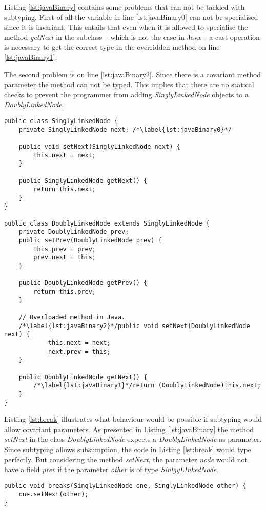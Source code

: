 Listing \ref{lst:javaBinary} contains some problems that can
not be tackled with subtyping. First of all the variable in line
\ref{lst:javaBinary0} can not be specialised since it is invariant. This
entails that even when it is allowed to specialise the method \emph{getNext}
in the subclass -- which is not the case in Java -- a cast operation
is necessary to get the correct type in the overridden method on line
\ref{lst:javaBinary1}.

The second problem is on line \ref{lst:javaBinary2}. Since there is
a covariant method parameter the method can not be typed. This implies
that there are no statical checks to prevent the programmer from adding
\emph{SinglyLinkedNode} objects to a \emph{DoublyLinkedNode}.

\begin{lstlisting}[float=ht,caption={Illegal subtyping of binary methods in Java.},label={lst:javaBinary}]
public class SinglyLinkedNode {
	private SinglyLinkedNode next; /*\label{lst:javaBinary0}*/

	public void setNext(SinglyLinkedNode next) {
		this.next = next;
	}

	public SinglyLinkedNode getNext() {
		return this.next;
	}
}

public class DoublyLinkedNode extends SinglyLinkedNode {
	private DoublyLinkedNode prev;
	public setPrev(DoublyLinkedNode prev) {
		this.prev = prev;
		prev.next = this;
	}

	public DoublyLinkedNode getPrev() {
		return this.prev;
	}

	// Overloaded method in Java.
	/*\label{lst:javaBinary2}*/public void setNext(DoublyLinkedNode next) {
			this.next = next;
			next.prev = this;
	}

	public DoublyLinkedNode getNext() {
		/*\label{lst:javaBinary1}*/return (DoublyLinkedNode)this.next;
	}
}
\end{lstlisting}

Listing \ref{lst:break} illustrates what behaviour would be possible
if subtyping would allow covariant parameters. As presented in
Listing \ref{lst:javaBinary} the method \emph{setNext} in the
class \emph{DoublyLinkedNode} expects a \emph{DoublyLinkedNode}
as parameter. Since subtyping allows subsumption, the code in
Listing \ref{lst:break} would type perfectly. But considering
the method \emph{setNext}, the parameter \emph{node} would not
have a field \emph{prev} if the parameter \emph{other} is of type
\emph{SinlgyLInkedNode}.

\begin{lstlisting}[float=ht,label={lst:break},caption={Breaking a doubly linked node.}]
public void breaks(SinglyLinkedNode one, SinglyLinkedNode other) {
	one.setNext(other);
}
\end{lstlisting}

